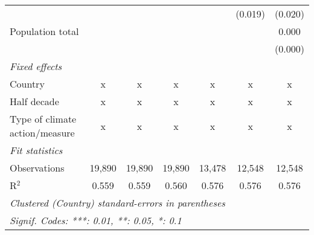 \begin{tabular}{lcccccc}
                                                                                       &               &                &                &                & (0.019)        & (0.020)\\   
   Population total                                                                    &               &                &                &                &                & 0.000\\   
                                                                                       &               &                &                &                &                & (0.000)\\   
   \emph{Fixed effects}\\
   Country                                                                             & x             & x              & x              & x              & x              & x\\  
   Half decade                                                                         & x             & x              & x              & x              & x              & x\\  
   Type of climate action/measure                                                      & x             & x              & x              & x              & x              & x\\  
   \midrule \emph{Fit statistics}\\
   Observations                                                                        & 19,890        & 19,890         & 19,890         & 13,478         & 12,548         & 12,548\\  
   R$^2$                                                                               & 0.559         & 0.559          & 0.560          & 0.576          & 0.576          & 0.576\\  
   \midrule
   \multicolumn{7}{l}{\emph{Clustered (Country) standard-errors in parentheses}}\\
   \multicolumn{7}{l}{\emph{Signif. Codes: ***: 0.01, **: 0.05, *: 0.1}}\\
\end{tabular}
\par\endgroup



